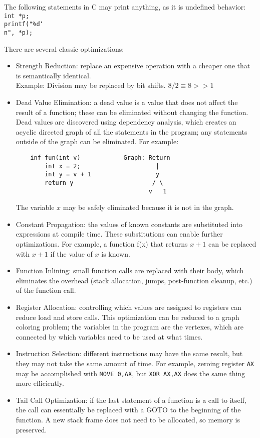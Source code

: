 \documentclass[twoside]{article}
\begin{document}
The following statements in C may print anything, as it is undefined behavior:\\
\texttt{int *p;\\ printf("\%d\char`\\ n", *p);}

There are several classic optimizations:

\begin{itemize}
  \item Strength Reduction: replace an expensive operation with a cheaper one that is semantically identical.\\
    Example: Division may be replaced by bit shifts. $8/2 \equiv 8 >> 1$
   \item Dead Value Elimination: a dead value is a value that does not affect the
    result of a function; these can be eliminated without changing the
    function. Dead values are discovered using dependency analysis, which
    creates an acyclic directed graph of all the statements in the program; any
    statements outside of the graph can be eliminated. For example:
    \begin{verbatim}
    inf fun(int v)            Graph: Return
        int x = 2;                     |
        int y = v + 1                  y
        return y                      / \
                                     v   1 
    \end{verbatim}
    The variable $x$ may be safely eliminated because it is not in the graph.
  \item Constant Propagation: the values of known constants are substituted into
    expressions at compile time. These substitutions can enable further
    optimizations. For example, a function f(x) that returns $x+1$ can be
    replaced with $x+1$ if the value of $x$ is known.
  \item Function Inlining: small function calls are replaced with their body,
    which eliminates the overhead (stack allocation, jumps, post-function
    cleanup, etc.) of the function call.
  \item Register Allocation: controlling which values are assigned to registers
    can reduce load and store calls. This optimization can be reduced to a graph
    coloring problem; the variables in the program are the vertexes, which are
    connected by which variables need to be used at what times.
  \item Instruction Selection: different instructions may have the same result,
    but they may not take the same amount of time. For example, zeroing
    register \texttt{AX} may be accomplished with \texttt{MOVE 0,AX}, but
    \texttt{XOR~AX,AX} does the same thing more efficiently.
  \item Tail Call Optimization: if the last statement of a function is a call to
    itself, the call can essentially be replaced with a GOTO to the beginning of
    the function. A new stack frame does not need to be allocated, so memory is
    preserved.
\end{itemize}
\end{document}
